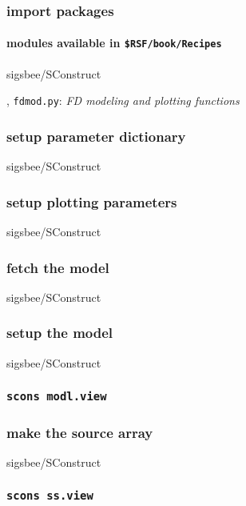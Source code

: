 \def\mycode#1#2{
  \small
  
  {sigsbee/SConstruct}
}

\begin{frame} \frametitle{import packages}
  \framesubtitle{modules available in \texttt{\$RSF/book/Recipes} }
  \mycode{1}{2}
  \sep
  \texttt{fdmod.py}: \textit{FD modeling and plotting functions}

\end{frame}
\cwpnote{}

\begin{frame} \frametitle{setup parameter dictionary}
  \mycode{6}{14}
\end{frame}
\cwpnote{}


\begin{frame} \frametitle{setup plotting parameters}
  \mycode{18}{18}
\end{frame}
\cwpnote{}

\begin{frame} \frametitle{fetch the model}
  \mycode{23}{25}
\end{frame}
\cwpnote{}

\begin{frame} \frametitle{setup the model}
  \mycode{28}{40}
\end{frame}
\cwpnote{}

\begin{frame} \frametitle{\texttt{scons modl.view}} 
\end{frame}

\begin{frame} \frametitle{make the source array}
  \mycode{44}{53}
\end{frame}
\cwpnote{}

\begin{frame} \frametitle{\texttt{scons ss.view}}
\end{frame}

